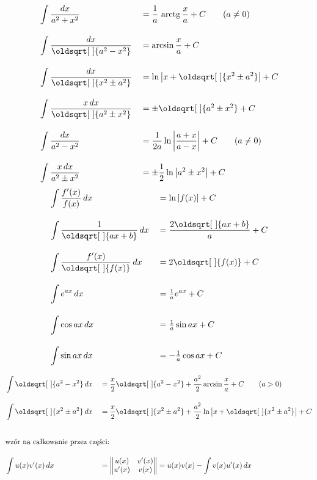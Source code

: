 \documentclass[10pt, twoside, fleqn]{article}
\renewcommand*{\sqrt}[2][\ ]{\oldsqrt[#1]{#2}}
\DeclareMathOperator{\arctg}{arctg}
\begin{document}
		\begin{multicols}{2}
		\noindent
			\begin{alignat*}{2}
				& \int{\frac{dx}{a^2+x^2}}					&&	=\frac{1}{a}\,\arctg{\frac{x}{a}}+C \hspace{20pt} (a \neq 0)				\\[1em]
				& \int{\frac{dx}{\sqrt{a^2-x^2}}}			&& 	=\arcsin{\frac{x}{a}}+C 													\\[1em]
				& \int{\frac{dx}{\sqrt{x^2 \pm a^2}}}		&& 	=\ln{\left|x+\sqrt{x^2 \pm a^2}\right|}+C 									\\[1em]
				& \int{\frac{x\,dx}{\sqrt{a^2 \pm x^2}}}	&& 	= \pm \sqrt{a^2 \pm x^2}+C 													\\[1em]
				& \int{\frac{dx}{a^2-x^2}}					&&	=\frac{1}{2a}\ln{\left|\frac{a+x}{a-x}\right|}+C \hspace{20pt} (a \neq 0) 	\\[1em]
				& \int{\frac{x\,dx}{a^2 \pm x^2}}			&&	=\pm \frac{1}{2}\ln{\left|a^2\pm x^2\right|}+C  							
			\end{alignat*}
			\begin{alignat*}{2}				
				& \int{\frac{f'(x)}{f(x)}\,dx}				&&  =\ln{\left|f(x)\right|}+C 													\\[1em]
				& \int{\frac{1}{\sqrt{ax+b}}\,dx} 			&&  =\frac{2\sqrt{ax+b}}{a} + C 												\\[1em]
				& \int{\frac{f'(x)}{\sqrt{f(x)}}\,dx}		&& 	=2\sqrt{f(x)}+C 															\\[1em]
				& \int{e^{ax}\,dx} 							&&  =\tfrac{1}{a} e^{ax} + C 													\\[1em]
				& \int{\cos{ax}\,dx} 						&& 	=\tfrac{1}{a} \sin{ax} + C 													\\[1em]
				& \int{\sin{ax}\,dx} 						&& 	=-\tfrac{1}{a} \cos{ax} + C 												
			\end{alignat*}	
		\end{multicols}

		\begin{alignat*}{2}	
			& \int{\sqrt{a^2-x^2}}\,dx		&& =\frac{x}{2}\sqrt{a^2-x^2}+\frac{a^2}{2}\arcsin{\frac{x}{a}}+C \hspace{20pt} (a>0)		\\[1em]
			& \int{\sqrt{x^2 \pm a^2}}\,dx	&& =\frac{x}{2} \sqrt{x^2 \pm a^2}+\frac{a^2}{2}\ln{\left|x+\sqrt{x^2 \pm a^2}\right|}+C 	\\[2em]
			& \text{wzór na całkowanie przez części:} \span\span \\[1em]
			& \int{u(x)v'(x)\,dx}			&& =
 			\begin{Vmatrix}
  				u(x)  & v'(x) \\
  				u'(x) & v(x)
 			\end{Vmatrix}					
		=u(x)v(x) - \int{v(x)u'(x)\,dx}
		\end{alignat*}
\end{document}
